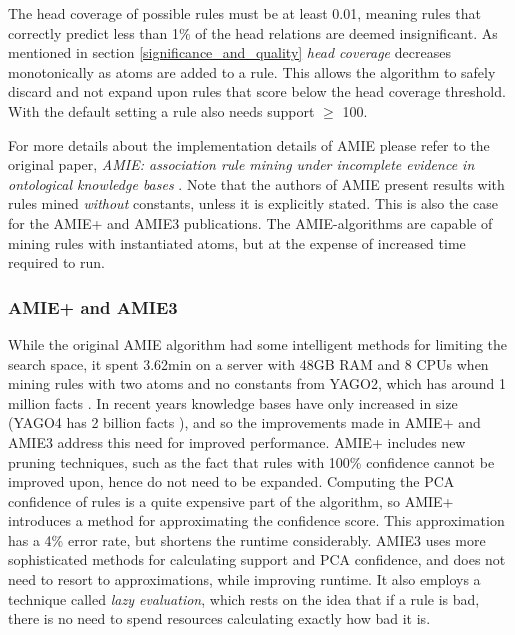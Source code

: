 The head coverage of possible rules must be at least 0.01, meaning rules that correctly predict less than 1\% of the head relations are deemed insignificant. As mentioned in section \ref{significance_and_quality} \textit{head coverage} decreases monotonically as atoms are added to a rule. This allows the algorithm to safely discard and not expand upon rules that score below the head coverage threshold. With the default setting a rule also needs support $\geq$ 100. %

For more details about the implementation details of AMIE please refer to the original paper, \textit{AMIE: association rule mining under incomplete evidence in ontological knowledge bases} \cite{amie_plus}. Note that the authors of AMIE present results with rules mined \textit{without} constants, unless it is explicitly stated. This is also the case for the AMIE+ and AMIE3 publications. The AMIE-algorithms are capable of mining rules with instantiated atoms, but at the expense of increased time required to run.

\subsubsection{AMIE+ and AMIE3}
While the original AMIE algorithm had some intelligent methods for limiting the search space, it spent 3.62min on a server with 48GB RAM and 8 CPUs \cite{amie} when mining rules with two atoms and no constants from YAGO2, which has around 1 million facts \cite{yago2}. In recent years knowledge bases have only increased in size (YAGO4 has 2 billion facts \cite{yago4}), and so the improvements made in AMIE+ and AMIE3 address this need for improved performance. AMIE+ includes new pruning techniques, such as the fact that rules with 100\% confidence cannot be improved upon, hence do not need to be expanded. Computing the PCA confidence of rules is a quite expensive part of the algorithm, so AMIE+ introduces a method for approximating the confidence score. This approximation has a 4\% error rate, but shortens the runtime considerably. AMIE3 uses more sophisticated methods for calculating support and PCA confidence, and does not need to resort to approximations, while improving runtime. It also employs a technique called \textit{lazy evaluation}, which rests on the idea that if a rule is bad, there is no need to spend resources calculating exactly how bad it is. 

